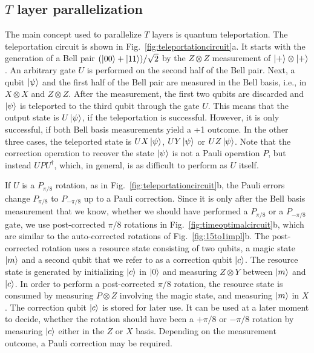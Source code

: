 \documentclass[prx,aps,letterpaper,twocolumn,allowfontchageintitle=true,accepted=2019-02-01]{quantumarticle}
\begin{document}
\subsection{$T$ layer parallelization}
The main concept used to parallelize $T$ layers is quantum teleportation. The teleportation circuit is shown in Fig.~\ref{fig:teleportationcircuit}a.  It starts with the generation of a Bell pair $(\ket{00} + \ket{11})/\sqrt{2}$ by the $Z \otimes Z$ measurement of $\ket{+} \otimes \ket{+}$. An arbitrary gate $U$ is performed on the second half of the Bell pair. Next, a qubit $\ket{\psi}$ and the first half of the Bell pair are measured in the Bell basis, i.e., in $X \otimes X$ and $Z \otimes Z$. After the measurement, the first two qubits are discarded and $\ket{\psi}$ is teleported to the third qubit through the gate $U$. This means that the output state is $U\ket{\psi}$, if the teleportation is successful. However, it is only successful, if both Bell basis measurements yield a +1 outcome. In the other three cases, the teleported state is $UX\ket{\psi}$, $UY\ket{\psi}$ or $UZ\ket{\psi}$. Note that the correction operation to recover the state $\ket{\psi}$ is not a Pauli operation $P$, but instead $UPU^\dagger$, which, in general, is as difficult to perform as $U$ itself.



If $U$ is a $P_{\pi/8}$ rotation, as in Fig.~\ref{fig:teleportationcircuit}b, the Pauli errors change $P_{\pi/8}$ to $P_{-\pi/8}$ up to a Pauli correction. Since it is only after the Bell basis measurement that we know, whether we should have performed a $P_{\pi/8}$ or a $P_{-\pi/8}$ gate, we use post-corrected $\pi/8$ rotations in Fig.~\ref{fig:timeoptimalcircuit}b, which are similar to the auto-corrected rotations of Fig.~\ref{fig:15to1impl}b. The post-corrected rotation uses a resource state consisting of two qubits, a magic state $\ket{m}$ and a second qubit that we refer to as a correction qubit $\ket{c}$. The resource state is generated by initializing $\ket{c}$ in $\ket{0}$ and measuring $Z \otimes Y$ between $\ket{m}$ and $\ket{c}$. In order to perform a post-corrected $\pi/8$ rotation, the resource state is consumed by measuring $P \otimes Z$ involving the magic state, and measuring $\ket{m}$ in $X$. The correction qubit $\ket{c}$ is stored for later use. It can be used at a later moment to decide, whether the rotation should have been a $+\pi/8$ or $-\pi/8$ rotation by measuring $\ket{c}$ either in the $Z$ or $X$ basis. Depending on the measurement outcome, a Pauli correction may be required.
\end{document}
